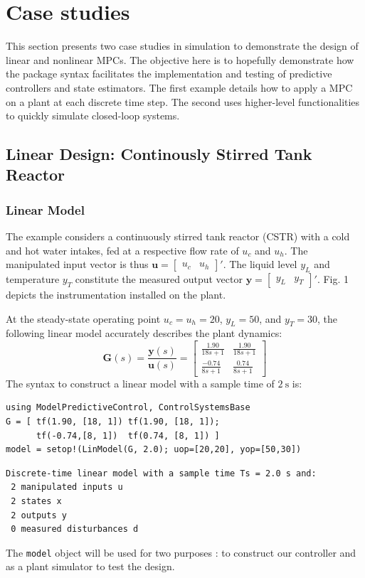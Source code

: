 \section{Case studies}

This section presents two case studies in simulation to demonstrate the design of linear and nonlinear MPCs. The objective here is to hopefully demonstrate how the package syntax facilitates the implementation and testing of predictive controllers and state estimators. The first example details how to apply a MPC on a plant at each discrete time step. The second uses higher-level functionalities to quickly simulate closed-loop systems. 

\subsection{Linear Design: Continously Stirred Tank Reactor}

\subsubsection{Linear Model}

The example considers a continuously stirred tank reactor (CSTR) with a cold and hot water intakes, fed at a respective flow rate of $u_c$ and $u_h$. The manipulated input vector is thus $\mathbf{u} = [\begin{smallmatrix}u_c & u_h\end{smallmatrix}]'$. The liquid level $y_L$ and temperature $y_T$ constitute the measured output vector $\mathbf{y} = [\begin{smallmatrix}y_L & y_T\end{smallmatrix}]'$. Fig. 1 depicts the instrumentation installed on the plant.

At the steady-state operating point $u_c=u_h=20$, $y_L=50$, and $y_T=30$, the following linear model accurately describes the plant dynamics:
\begin{equation}
\mathbf{G}(s) = \frac{\mathbf{y}(s)}{\mathbf{u}(s)} =
\begin{bmatrix}
    \frac{1.90}{18s+1} & \frac{1.90}{18s+1} \\[3pt]
    \frac{-0.74}{8s+1} & \frac{0.74}{8s+1}
\end{bmatrix}
\end{equation}
The syntax to construct a linear model with a sample time of $\SI{2}{\second}$ is:
\begin{verbatim}
using ModelPredictiveControl, ControlSystemsBase
G = [ tf(1.90, [18, 1]) tf(1.90, [18, 1]);
      tf(-0.74,[8, 1])  tf(0.74, [8, 1]) ]
model = setop!(LinModel(G, 2.0); uop=[20,20], yop=[50,30])
\end{verbatim}
\spacerepl
\begin{verbatim}
Discrete-time linear model with a sample time Ts = 2.0 s and:
 2 manipulated inputs u
 2 states x
 2 outputs y
 0 measured disturbances d
\end{verbatim}
The \texttt{model} object will be used for two purposes : to construct our controller and as a plant simulator to test the design.

